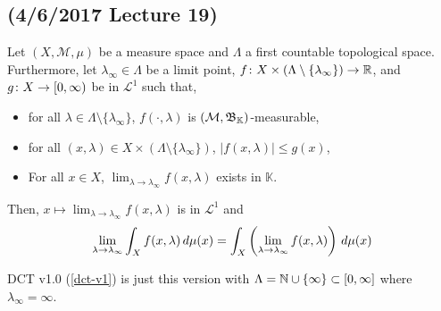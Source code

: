 \documentclass[11pt,leqno,oneside]{amsbook}
\numberwithin{thm}{section}
\newcommand{\M}{\mathcal{M}}
\newcommand{\cL}{\mathcal{L}}
\newcommand{\K}{\mathbb{K}} %
\begin{document}
\subsection*{(4/6/2017 Lecture 19)}
\begin{thm}
  Let \((X,\M,\mu)\) be a measure space and \(\Lambda\) a first
  countable topological space. Furthermore, let \(\lambda_\infty \in
  \Lambda\) be a limit point, \(f \colon X \times (\Lambda
  \setminus \{\lambda_\infty\}) \to {\mathbb R}\), and \(g \colon X \to
  [0,\infty)\) be in \(\cL^1\) such that,
  \begin{itemize}
  \item for all \(\lambda \in
  \Lambda \setminus \{\lambda_\infty\}\), \(f(\cdot, \lambda)\) is
  \((\M,\B_\K)\)-measurable,
  \item for all \((x,\lambda) \in X \times
  (\Lambda \setminus \{\lambda_\infty\})\), \(|f(x,\lambda)| \leq
  g(x)\),
  \item For all \(x \in X\), \(\lim_{\lambda \to \lambda_\infty}
    f(x,\lambda)\) exists in \(\K\).
  \end{itemize}
  Then, \(x \mapsto \lim_{\lambda \to \lambda_\infty} f(x,\lambda)\)
  is in \(\cL^1\) and \[
    \lim_{\lambda \to \lambda_\infty} \int_X f(x,\lambda) \, d \mu(x) =
    \int_X \left( \lim_{\lambda \to \lambda_\infty} f(x,\lambda)
    \right) \, d \mu(x)
  \]
\end{thm}
\begin{rmk}
  DCT v1.0 (\ref{dct-v1}) is just this version with \(\Lambda = {\mathbb N} \cup \{\infty\}
  \subset [0,\infty]\) where \(\lambda_\infty = \infty\).
\end{rmk}
\end{document}
